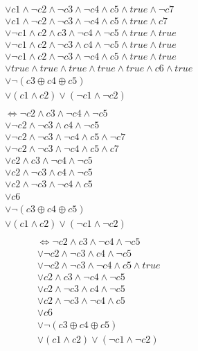 \documentclass{scrartcl}
\begin{document}
\begin{itemize}
\begin{align*}
    &\lor c1 \land ¬c2 \land ¬c3 \land ¬c4 \land c5 \land true \land ¬c7\\
    &\lor c1 \land ¬c2 \land ¬c3 \land ¬c4 \land c5 \land true \land c7\\
    &\lor ¬c1 \land c2 \land c3 \land ¬c4 \land ¬c5 \land true \land true\\
    &\lor ¬c1 \land c2 \land ¬c3 \land c4 \land ¬c5 \land true \land true\\
    &\lor ¬c1 \land c2 \land ¬c3 \land ¬c4 \land c5 \land true \land true\\
    &\lor true \land true \land true \land true \land true \land c6 \land true\\
    &\lor ¬(c3 \oplus c4 \oplus c5)\\
    &\lor (c1 \land c2 )\lor(¬c1 \land ¬c2)\\\\
    &\Leftrightarrow ¬c2 \land c3 \land ¬c4 \land ¬c5\\
    &\lor ¬c2 \land ¬c3 \land c4 \land ¬c5 \\
    &\lor ¬c2 \land ¬c3 \land ¬c4 \land c5 \land ¬c7\\
    &\lor ¬c2 \land ¬c3 \land ¬c4 \land c5 \land c7\\
    &\lor c2 \land c3 \land ¬c4 \land ¬c5 \\
    &\lor c2 \land ¬c3 \land c4 \land ¬c5 \\
    &\lor c2 \land ¬c3 \land ¬c4 \land c5 \\
    &\lor c6\\
    &\lor ¬(c3 \oplus c4 \oplus c5)\\
    &\lor (c1 \land c2 )\lor(¬c1 \land ¬c2)\\
    \end{align*}
    \newpage
    \begin{align*}
    &\Leftrightarrow ¬c2 \land c3 \land ¬c4 \land ¬c5\\
    &\lor ¬c2 \land ¬c3 \land c4 \land ¬c5 \\
    &\lor ¬c2 \land ¬c3 \land ¬c4 \land c5 \land true\\
    &\lor c2 \land c3 \land ¬c4 \land ¬c5 \\
    &\lor c2 \land ¬c3 \land c4 \land ¬c5 \\
    &\lor c2 \land ¬c3 \land ¬c4 \land c5 \\
    &\lor c6\\
    &\lor ¬(c3 \oplus c4 \oplus c5)\\
    &\lor (c1 \land c2 )\lor(¬c1 \land ¬c2)\\\\

\end{align*}
\end{itemize}
\end{document}

